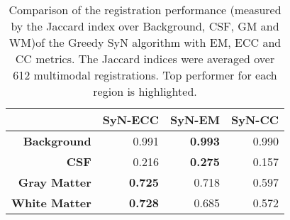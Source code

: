 \begin{table}[htbp]
  \centering
  {\small
    \begin{tabular}{rrrr}
    \toprule
          & \textbf{SyN-ECC} & \textbf{SyN-EM} & \textbf{SyN-CC} \\
    \midrule
    \textbf{Background} & 0.991 & \textbf{0.993} & 0.990 \\
    \textbf{CSF} & 0.216 & \textbf{0.275} & 0.157 \\
    \textbf{Gray Matter} & \textbf{0.725} & 0.718 & 0.597 \\
    \textbf{White Matter} & \textbf{0.728} & 0.685 & 0.572 \\
    \bottomrule
    \end{tabular}}%
  \caption{Comparison of the registration performance (measured by the Jaccard index over Background, CSF, GM and WM)of the Greedy SyN algorithm with EM, ECC and CC metrics. The Jaccard
indices were averaged over 612 multimodal registrations. Top performer for each region is highlighted.}
  \label{tab:multimodal_results_segTri_fill}%
\end{table}%

